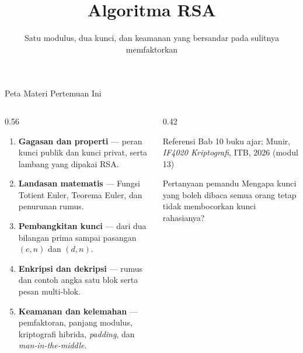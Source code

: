 \documentclass[aspectratio=169,11pt]{beamer}
\title{Algoritma RSA}
\subtitle{Satu modulus, dua kunci, dan keamanan yang bersandar pada sulitnya memfaktorkan}
\begin{document}
\begin{frame}[plain]
    \titlepage
\end{frame}

\begin{frame}{Peta Materi Pertemuan Ini}
    \begin{columns}[T,onlytextwidth]
        \begin{column}{0.56\textwidth}
            \begin{enumerate}
                \item \textbf{Gagasan dan properti} --- peran kunci publik
                      dan kunci privat, serta lambang yang dipakai RSA.
                \item \textbf{Landasan matematis} --- Fungsi Totient Euler,
                      Teorema Euler, dan penurunan rumus.
                \item \textbf{Pembangkitan kunci} --- dari dua bilangan prima
                      sampai pasangan $(e,n)$ dan $(d,n)$.
                \item \textbf{Enkripsi dan dekripsi} --- rumus dan contoh
                      angka satu blok serta pesan multi-blok.
                \item \textbf{Keamanan dan kelemahan} --- pemfaktoran, panjang
                      modulus, kriptografi hibrida, \textit{padding}, dan
                      \textit{man-in-the-middle}.
            \end{enumerate}
        \end{column}
        \begin{column}{0.42\textwidth}
            \begin{block}{Referensi}
                \footnotesize
                Bab 10 buku ajar; Munir, \textit{IF4020 Kriptografi}, ITB,
                2026 (modul 13)
            \end{block}
            \begin{exampleblock}{Pertanyaan pemandu}
                \footnotesize
                Mengapa kunci yang boleh dibaca semua orang tetap tidak
                membocorkan kunci rahasianya?
            \end{exampleblock}
        \end{column}
    \end{columns}
\end{frame}
\end{document}
